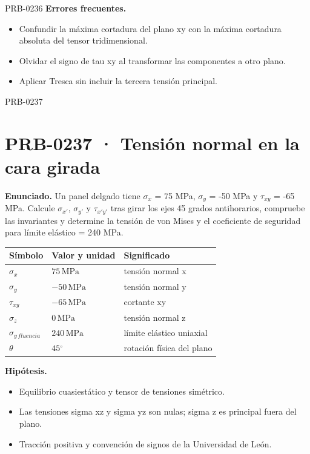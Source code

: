 \begin{studiumworked}{PRB-0236}
\textbf{Errores frecuentes.}\begin{itemize}\item Confundir la máxima cortadura del plano xy con la máxima cortadura absoluta del tensor tridimensional.
\item Olvidar el signo de tau xy al transformar las componentes a otro plano.
\item Aplicar Tresca sin incluir la tercera tensión principal.\end{itemize}

\end{studiumworked}

\Needspace{.3\textheight}

\begin{studiumworked}{PRB-0237}

\section{PRB-0237 · Tensión normal en la cara girada}

\textbf{Enunciado.} Un panel delgado tiene $\sigma_x$ = 75 MPa, $\sigma_y$ = -50 MPa y $\tau_{xy}$ = -65 MPa. Calcule $\sigma_{x\prime}$, $\sigma_{y\prime}$ y $\tau_{x\prime y\prime}$ tras girar los ejes 45 grados antihorarios, compruebe las invariantes y determine la tensión de von Mises y el coeficiente de seguridad para límite elástico = 240 MPa.

\par\medskip\noindent\begin{tabular}{@{}p{.18\linewidth}p{.26\linewidth}p{.48\linewidth}@{}}
\toprule Símbolo & Valor y unidad & Significado\\\midrule
$\sigma_{x}$ & $75\,\mathrm{MPa}$ & tensión normal x\\
$\sigma_{y}$ & $-50\,\mathrm{MPa}$ & tensión normal y\\
$\tau_{xy}$ & $-65\,\mathrm{MPa}$ & cortante xy\\
$\sigma_{z}$ & $0\,\mathrm{MPa}$ & tensión normal z\\
$\sigma_{y\,fluencia}$ & $240\,\mathrm{MPa}$ & límite elástico uniaxial\\
$\theta$ & $45{}^{\circ}$ & rotación física del plano\\
\bottomrule\end{tabular}\par\medskip

\textbf{Hipótesis.}\begin{itemize}\item Equilibrio cuasiestático y tensor de tensiones simétrico.
\item Las tensiones sigma xz y sigma yz son nulas; sigma z es principal fuera del plano.
\item Tracción positiva y convención de signos de la Universidad de León.\end{itemize}


\end{studiumworked}
